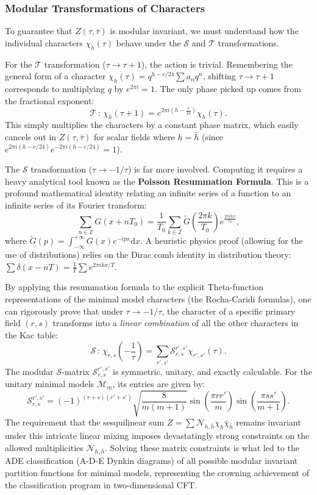 \subsubsection{Modular Transformations of Characters}

To guarantee that \(Z(\tau, \bar{\tau})\) is modular invariant, we must understand how the individual characters \(\chi_h(\tau)\) behave under the \(\mathcal{S}\) and \(\mathcal{T}\) transformations.

For the \(\mathcal{T}\) transformation (\(\tau \to \tau + 1\)), the action is trivial. Remembering the general form of a character \(\chi_h(\tau) = q^{h - c/24} \sum a_n q^n\), shifting \(\tau \to \tau+1\) corresponds to multiplying \(q\) by \(e^{2\pi i} = 1\). The only phase picked up comes from the fractional exponent:
\[
    \mathcal{T} \,:\, \chi_h(\tau + 1) = e^{2\pi i \left(h - \frac{c}{24}\right)} \chi_h(\tau).
\]
This simply multiplies the characters by a constant phase matrix, which easily cancels out in \(Z(\tau, \bar{\tau})\) for scalar fields where \(h = \bar{h}\) (since \(e^{2\pi i(h-c/24)} e^{-2\pi i(h-c/24)} = 1\)).

The \(\mathcal{S}\) transformation (\(\tau \to -1/\tau\)) is far more involved. Computing it requires a heavy analytical tool known as the \textbf{Poisson Resummation Formula}. This is a profound mathematical identity relating an infinite series of a function to an infinite series of its Fourier transform:
\[
    \sum_{n \in \mathbb{Z}} G(x + nT_0) = \frac{1}{T_0} \sum_{k \in \mathbb{Z}} \tilde{G}\left(\frac{2\pi k}{T_0}\right) e^{\frac{2\pi i k x}{T_0}},
\]
where \(\tilde{G}(p) = \int_{-\infty}^{+\infty} G(x)e^{-ipx}\mathrm{d}x\). A heuristic physics proof (allowing for the use of distributions) relies on the Dirac comb identity in distribution theory: $\sum \delta(x - nT) = \frac{1}{T} \sum e^{2\pi i k x / T}$.

By applying this resummation formula to the explicit Theta-function representations of the minimal model characters (the Rocha-Caridi formulas), one can rigorously prove that under \(\tau \to -1/\tau\), the character of a specific primary field \((r,s)\) transforms into a \textit{linear combination} of all the other characters in the Kac table:
\[
    \mathcal{S} \,:\, \chi_{r,s}\left(-\frac{1}{\tau}\right) = \sum_{r',s'} \mathcal{S}_{r,s}^{r',s'} \chi_{r',s'}(\tau).
\]
The modular \(\mathcal{S}\)-matrix \(\mathcal{S}_{r,s}^{r',s'}\) is symmetric, unitary, and exactly calculable. For the unitary minimal models \(\mathcal{M}_m\), its entries are given by:
\[
    \mathcal{S}_{r,s}^{r',s'} = (-1)^{(r+s)(r'+s')} \sqrt{\frac{8}{m(m+1)}} \sin\left( \frac{\pi r r'}{m} \right) \sin\left( \frac{\pi s s'}{m+1} \right).
\]
The requirement that the sesquilinear sum \(Z = \sum \mathcal{N}_{h,\bar{h}} \chi_h \bar{\chi}_{\bar{h}}\) remains invariant under this intricate linear mixing imposes devastatingly strong constraints on the allowed multiplicities \(\mathcal{N}_{h,\bar{h}}\). Solving these matrix constraints is what led to the ADE classification (A-D-E Dynkin diagrams) of all possible modular invariant partition functions for minimal models, representing the crowning achievement of the classification program in two-dimensional CFT.

